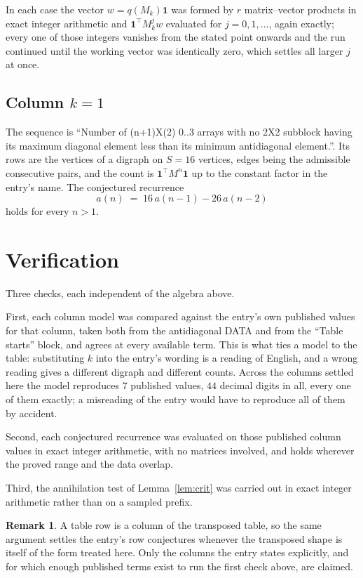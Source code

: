 \documentclass[11pt,a4paper]{article}
\theoremstyle{plain}
\theoremstyle{definition}
\newtheorem{remark}[theorem]{Remark}
\begin{document}
In each case the vector $w=q(M_k)\mathbf{1}$ was formed by $r$ matrix--vector products in
exact integer arithmetic and $\mathbf{1}^{\!\top}M_k^{j}w$ evaluated for $j=0,1,\dots$,
again exactly; every one of those integers vanishes from the stated point onwards and the run
continued until the working vector was identically zero, which settles all larger $j$ at once.

\subsection*{Column $k=1$}
The sequence is ``Number of (n+1)X(2) 0..3 arrays with no 2X2 subblock having its maximum diagonal element less than its minimum antidiagonal element.''. Its rows are the vertices of a digraph on
$S=16$ vertices, edges being the admissible consecutive pairs, and the count is
$\mathbf{1}^{\!\top}M^{n}\mathbf{1}$ up to the constant factor in the entry's name.
The conjectured recurrence
\[
a(n)\;=\;16\,a(n-1) - 26\,a(n-2)
\]
holds for every $n>1$.

\section{Verification}

Three checks, each independent of the algebra above.

First, each column model was compared against the entry's own published values for that
column, taken both from the antidiagonal DATA and from the ``Table starts'' block, and agrees
at every available term. This is what ties a model to the table: substituting $k$ into the
entry's wording is a reading of English, and a wrong reading gives a different digraph and
different counts. Across the columns settled here the model reproduces $7$ published
values, $44$ decimal digits in all, every one of them exactly; a misreading of the entry
would have to reproduce all of them by accident.

Second, each conjectured recurrence was evaluated on those published column values in exact
integer arithmetic, with no matrices involved, and holds wherever the proved range and the
data overlap.

Third, the annihilation test of Lemma~\ref{lem:crit} was carried out in exact integer
arithmetic rather than on a sampled prefix.

\begin{remark}
A table row is a column of the transposed table, so the same argument settles the entry's row
conjectures whenever the transposed shape is itself of the form treated here. Only the columns
the entry states explicitly, and for which enough published terms exist to run the first check
above, are claimed.
\end{remark}
\end{document}
